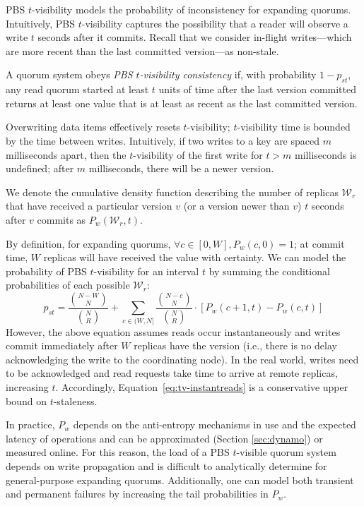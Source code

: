 \documentclass{vldb}
\begin{document}
PBS $t$-visibility models the probability of inconsistency for
expanding quorums.  Intuitively, PBS $t$-visibility captures the
possibility that a reader will observe a write $t$ seconds after it
commits.  Recall that we consider in-flight writes---which are more
recent than the last committed version---as non-stale.

\begin{definition}
A quorum system obeys \textit{PBS $t$-visibility consistency} if, with
probability $1-p_{st}$, any read quorum started at least $t$ units
of time after the last version committed returns at least one value
that is at least as recent as the last committed version.
\end{definition}

Overwriting data items effectively resets $t$-visibility;
$t$-visibility time is bounded by the time between writes.
Intuitively, if two writes to a key are spaced $m$ milliseconds apart,
then the $t$-visibility of the first write for $t > m$ milliseconds is
undefined; after $m$ milliseconds, there will be a newer version.

We denote the cumulative density function describing the number of
replicas $\mathcal{W}_r$ that have received a particular version $v$ (or
a version newer than $v$) $t$ seconds after $v$ commits as
$P_w(\mathcal{W}_r, t)$.

By definition, for expanding quorums, $\forall c \in [0, W], P_w(c,0)
= 1$; at commit time, $W$ replicas will have received the value with
certainty.  We can model the probability of PBS $t$-visibility for an
interval $t$ by summing the conditional probabilities of each possible
$\mathcal{W}_r$:
\begin{equation}
\label{eq:tv-instantreads}
p_{st} = \frac{{N-W \choose N}}{{N \choose R}}+\sum_{c\in(W, N]} \frac{{N-c \choose N}}{{N \choose R}}\cdot [P_w(c+1, t)-P_w(c,t)]
\end{equation}
However, the above equation assumes reads occur instantaneously and
writes commit immediately after $W$ replicas have the version (i.e.,
there is no delay acknowledging the write to the coordinating node).
In the real world, writes need to be acknowledged and read requests
take time to arrive at remote replicas, increasing $t$.  Accordingly,
Equation~\ref{eq:tv-instantreads} is a conservative upper bound on
$t$-staleness.

In practice, $P_w$ depends on the anti-entropy mechanisms in use and the
expected latency of operations and can be approximated (Section
\ref{sec:dynamo}) or measured online.  For this reason, the load of a
PBS $t$-visible quorum system depends on write propagation and is
difficult to analytically determine for general-purpose expanding
quorums.  Additionally, one can model both transient and permanent
failures by increasing the tail probabilities in $P_w$.
\end{document}

